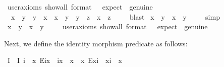 \begin{isabellebody}
\ {\isacharbrackleft}user{\isacharunderscore}axioms{\isacharcomma}\ show{\isacharunderscore}all{\isacharcomma}\ format\ {\isacharequal}\ {}{\isacharcomma}\ expect\ {\isacharequal}\ genuine{\isacharbrackright}%
\isadelimproof
\ %
\endisadelimproof
%
\isatagproof
{}\isamarkupfalse%
%
\endisatagproof
{\isafoldproof}%
%
\isadelimproof
%
\endisadelimproof
\ \ \isanewline
{}\isamarkupfalse%
\ {\isachardoublequoteopen}\ {\isacharparenleft}x\ {\isasymsimeq}\ y\ \isactrlbold {\isasymrightarrow}\ y\ {\isasymsimeq}\ x{\isacharparenright}\ \isactrlbold {\isasymand}\ {\isacharparenleft}{\isacharparenleft}x\ {\isasymsimeq}\ y\ \isactrlbold {\isasymand}\ y\ {\isasymsimeq}\ z{\isacharparenright}\ \isactrlbold {\isasymrightarrow}\ x\ {\isasymsimeq}\ z{\isacharparenright}{\isachardoublequoteclose}\ \isanewline
%
\isadelimproof
\ \ %
\endisadelimproof
%
\isatagproof
{}\isamarkupfalse%
\ blast%
\endisatagproof
{\isafoldproof}%
%
\isadelimproof
\isanewline
%
\endisadelimproof
{}\isamarkupfalse%
\ {\isachardoublequoteopen}x\ {\isasymsimeq}\ y\ \isactrlbold {\isasymrightarrow}\ x\ {\isasymcong}\ y{\isachardoublequoteclose}\ \isanewline
%
\isadelimproof
\ \ %
\endisadelimproof
%
\isatagproof
{}\isamarkupfalse%
\ simp%
\endisatagproof
{\isafoldproof}%
%
\isadelimproof
\isanewline
%
\endisadelimproof
{}\isamarkupfalse%
\ {\isachardoublequoteopen}x\ {\isasymsimeq}\ y\ \isactrlbold {\isasymleftarrow}\ x\ {\isasymcong}\ y{\isachardoublequoteclose}\ %
\isanewline
\ \ \isamarkupfalse%
\ {\isacharbrackleft}user{\isacharunderscore}axioms{\isacharcomma}\ show{\isacharunderscore}all{\isacharcomma}\ format\ {\isacharequal}\ {}{\isacharcomma}\ expect\ {\isacharequal}\ genuine{\isacharbrackright}%
\isadelimproof
\ %
\endisadelimproof
%
\isatagproof
{}\isamarkupfalse%
%
\endisatagproof
{\isafoldproof}%
%
\isadelimproof
%
\endisadelimproof
%
\begin{isamarkuptext}%
Next, we define the identity morphism predicate  as follows:%
\end{isamarkuptext}\isamarkuptrue%
\isamarkupfalse%
\ I\ \ {\isachardoublequoteopen}I\ i\ {\isasymequiv}\ {\isacharparenleft}\isactrlbold {\isasymforall}x{\isachardot}\ E{\isacharparenleft}i{\isasymcdot}x{\isacharparenright}\ \isactrlbold {\isasymrightarrow}\ i{\isasymcdot}x\ {\isasymcong}\ x{\isacharparenright}\ \isactrlbold {\isasymand}\ {\isacharparenleft}\isactrlbold {\isasymforall}x{\isachardot}\ E{\isacharparenleft}x{\isasymcdot}i{\isacharparenright}\ \isactrlbold {\isasymrightarrow}\ x{\isasymcdot}i\ {\isasymcong}\ x{\isacharparenright}{\isachardoublequoteclose}%

\end{isabellebody}
